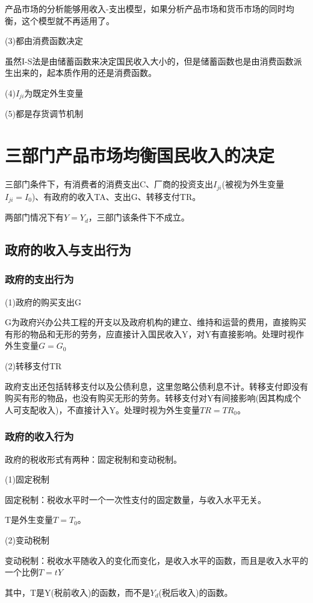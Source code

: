 \documentclass{article}
\begin{document}
产品市场的分析能够用收入-支出模型，如果分析产品市场和货币市场的同时均衡，这个模型就不再适用了。

(3)都由消费函数决定

虽然I-S法是由储蓄函数来决定国民收入大小的，但是储蓄函数也是由消费函数派生出来的，起本质作用的还是消费函数。

(4)$ I_{ji} $为既定外生变量

(5)都是存货调节机制

\section{三部门产品市场均衡国民收入的决定}
三部门条件下，有消费者的消费支出C、厂商的投资支出$ I_{ji} $(被视为外生变量$ I_{ji}=I_0 $)、有政府的收入TA、支出G、转移支付TR。

两部门情况下有$ Y=Y_d $，三部门该条件下不成立。
\subsection{政府的收入与支出行为}
\subsubsection{政府的支出行为}
(1)政府的购买支出G

G为政府兴办公共工程的开支以及政府机构的建立、维持和运营的费用，直接购买有形的物品和无形的劳务，应直接计入国民收入Y，对Y有直接影响。处理时视作外生变量$ G=G_0 $

(2)转移支付TR

政府支出还包括转移支付以及公债利息，这里忽略公债利息不计。转移支付即没有购买有形的物品，也没有购买无形的劳务。转移支付对Y有间接影响(因其构成个人可支配收入)，不直接计入Y。处理时视为外生变量$ TR=TR_0 $。

\subsubsection{政府的收入行为}
政府的税收形式有两种：固定税制和变动税制。

(1)固定税制

固定税制：税收水平时一个一次性支付的固定数量，与收入水平无关。

T是外生变量$ T=T_0 $。

(2)变动税制

变动税制：税收水平随收入的变化而变化，是收入水平的函数，而且是收入水平的一个比例$ T=tY $

其中，T是Y(税前收入)的函数，而不是$ Y_d $(税后收入)的函数。
\end{document}
